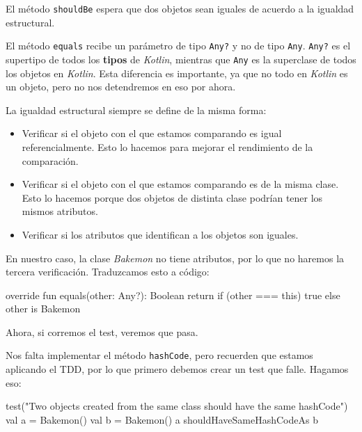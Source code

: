   \begin{important}
    El método \texttt{shouldBe} espera que dos objetos sean iguales de acuerdo a la igualdad
    estructural.
  \end{important}

  \begin{note}
    El método \texttt{equals} recibe un parámetro de tipo \texttt{Any?} y no de tipo
    \texttt{Any}. 
    \texttt{Any?} es el supertipo de todos los \textbf{tipos} de \textit{Kotlin}, mientras que 
    \texttt{Any} es la superclase de todos los objetos en \textit{Kotlin}.
    Esta diferencia es importante, ya que no todo en \textit{Kotlin} es un objeto, pero no nos
    detendremos en eso por ahora.
  \end{note}

  La igualdad estructural siempre se define de la misma forma:

  \begin{itemize}
    \item Verificar si el objeto con el que estamos comparando es igual referencialmente.
      Esto lo hacemos para mejorar el rendimiento de la comparación.
    \item Verificar si el objeto con el que estamos comparando es de la misma clase.
      Esto lo hacemos porque dos objetos de distinta clase podrían tener los mismos atributos.
    \item Verificar si los atributos que identifican a los objetos son iguales.
  \end{itemize}

  En nuestro caso, la clase \textit{Bakemon} no tiene atributos, por lo que no haremos la tercera
  verificación.
  Traduzcamos esto a código:

  \begin{kotlin}
    override fun equals(other: Any?): Boolean {
      return if (other === this) {
        true
      } else {
        other is Bakemon
      }
    }
  \end{kotlin}

  Ahora, si corremos el test, veremos que pasa.

  Nos falta implementar el método \texttt{hashCode}, pero recuerden que estamos aplicando el TDD,
  por lo que primero debemos crear un test que falle.
  Hagamos eso:

  \begin{kotlin}
    test("Two objects created from the same class should have the same hashCode") {
      val a = Bakemon()
      val b = Bakemon()
      a shouldHaveSameHashCodeAs b
    }
  \end{kotlin}

